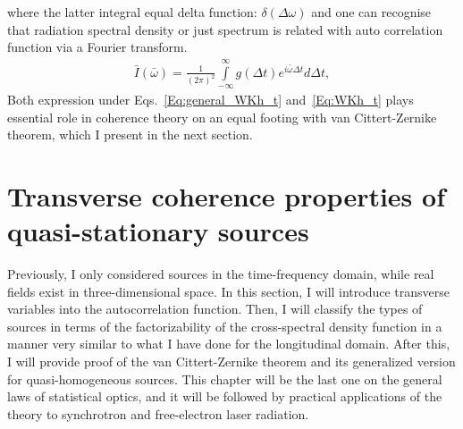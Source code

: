     where the latter integral equal delta function: $\delta(\Delta \omega)$ and one can recognise that radiation spectral density or just spectrum is related with auto correlation function via a Fourier transform.
    \begin{align}
        \bar{I}(\bar{\omega}) = \frac{1}{(2 \pi)^2} \int \limits_{-\infty}^{\infty}  g(\Delta t) e^{i \bar{\omega} \Delta t} d \Delta t,
        \label{Eq:WKh_t}
    \end{align}
    Both expression under Eqs.~\ref{Eq:general_WKh_t} and~\ref{Eq:WKh_t} plays essential role in coherence theory on an equal footing with van Cittert-Zernike theorem, which I present in the next section. 

\section{Transverse coherence properties of quasi-stationary sources}
\label{Sec:Transverse coherence properties of quasi-stationary sources}
    Previously, I only considered sources in the time-frequency domain, while real fields exist in three-dimensional space. In this section, I will introduce transverse variables into the autocorrelation function. Then, I will classify the types of sources in terms of the factorizability of the cross-spectral density function in a manner very similar to what I have done for the longitudinal domain. After this, I will provide proof of the van Cittert-Zernike theorem and its generalized version for quasi-homogeneous sources. This chapter will be the last one on the general laws of statistical optics, and it will be followed by practical applications of the theory to synchrotron and free-electron laser radiation.

